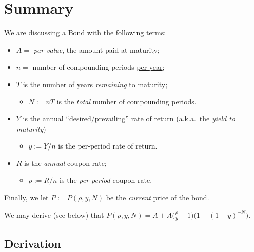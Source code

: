 \documentclass[12pt,reqno]{amsart}
\renewcommand{\.}{\mspace{1.5mu}}
\newcommand{\?}{\mspace{-1.5mu}}
\begin{document}
\tableofcontents





\section{Summary}


\begin{definition}
    We are discussing a Bond with the following terms:
    \begin{itemize}
        \item $A =$ \emph{par value}, the amount paid at maturity;
        \item $n =$ number of compounding periods \underline{per year};
        \item $T$ is the number of years \emph{remaining} to maturity;
            \begin{itemize}[itemindent=0pt]
                \item $N:=nT$ is the \emph{total} number of compounding periods. 
            \end{itemize}
        \item $Y$ is the \underline{annual} ``desired/prevailing\footnotemark'' rate of return (a.k.a.~the \emph{yield to maturity}) %
            \begin{itemize} 
                \item $y := Y/n$ is the per-period rate of return. 
            \end{itemize}
        \item $R$ is the \emph{annual} coupon rate; 
            \begin{itemize} 
                \item $ρ := R/n$ is the \emph{per-period} coupon rate.
            \end{itemize}
    \end{itemize}
    Finally, we let $P := P(ρ, y, N)$ be the \emph{current} price of the bond.
\end{definition}

We may derive (see below) that
    \(
        P(ρ, y, N) = A + A\big(\tfrac{ρ}{y}-1\big)\big(1-(1+y)^{-N}\big).  
    \)


\vspace{3\baselineskip}
\subsection{Derivation}
\end{document}
